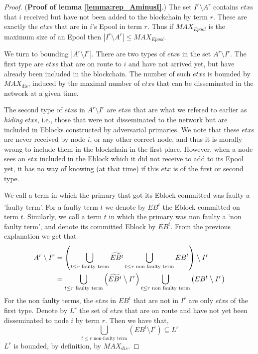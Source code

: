 \begin{proof}(\textbf{Proof of lemma \ref{lemma:rep_AminusI}}.)
The set $I^{r}\setminus A^r$ contains $etx$s that $i$ received but have not been added to the blockchain by term $r$. These are exactly the $etx$s that are in $i$'s Epool in term $r$. Thus if $MAX_{Epool}$ is the maximum size of an Epool then $|I^{r}\setminus A^r|\leq MAX_{Epool}$. 

We turn to bounding  $|A^{r}\setminus I^r|$.
There are two types of $etx$s in the set $A^r\setminus I^r$. The first type are $etx$s that are on route to $i$ and have not arrived yet, but have already been included in the blockchain. The number of such $etx$s is bounded by $MAX_\text{dis}$, induced by the maximal number of $etx$s that can be disseminated in the network at a given time. 

The second type of $etx$s in $A^r \setminus I^{r}$ are $etx$s that are what we refered to earlier as \textit{hiding} $etx$s, i.e., those that were not disseminated to the network but are included in Eblocks constructed by adversarial primaries. We note that these $etx$s are never received by node $i$, or any other correct node, and thus it is morally wrong to include them in the blockchain in the first place. However, when a node sees an $etx$ included in the Eblock which it did not receive to add to its Epool yet, it has no way of knowing (at that time) if this $etx$ is of the first or second type.  

We call a term in which the primary that got its Eblock committed was faulty a 'faulty term'. For a faulty term $t$ we denote by $\widetilde{EB^t}$ the Eblock committed on term $t$. Similarly, we call a term $t$ in which the primary was non faulty a `non faulty term', and denote its committed Eblock by $EB^t$.  From  the previous explanation we get that
\begin{align}
A^r\setminus I^r &= \left(\bigcup_{t\leq r \text{ faulty term}}\widetilde{EB^t} \bigcup_{t\leq r \text{ non faulty term}} EB^t\right)\mathbin{\big\backslash} I^r\\
&= \bigcup_{t\leq r \text{ faulty term}} \left (\widetilde{EB^t} \mathbin{\big\backslash} I^r \right ) \bigcup_{t\leq r \text{ non faulty term}} \left (EB^t \mathbin{\big\backslash} I^r \right )\label{eq:rep_e}
\end{align}
For the non faulty terms, the $etx$s in $EB^t$ that are not in $I^r$ are only $etx$s of the first type. Denote by $L^r$ the set of $etx$s that are on route and have not yet been disseminated to node $i$ by term $r$. Then we have that,
\begin{equation} \label{eq:rep_nonfault}
\bigcup_{t\leq r \text{ non-faulty term}} \left (EB^t\setminus I^r \right )\subseteq L^r
\end{equation}
$L^r$ is bounded, by definition, by $MAX_{dis}$.


\end{proof}
